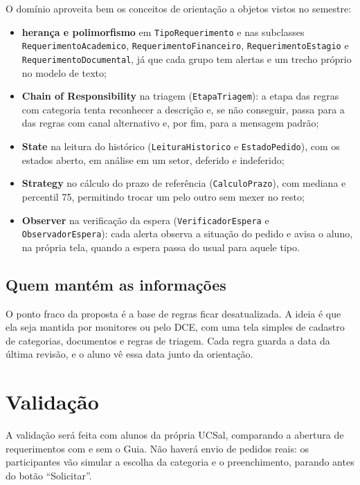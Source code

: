 \documentclass[12pt,a4paper]{article}
\begin{document}
O domínio aproveita bem os conceitos de orientação a objetos vistos no semestre:
\begin{itemize}
  \item \textbf{herança e polimorfismo} em \texttt{TipoRequerimento} e nas subclasses
        \texttt{RequerimentoAcademico}, \texttt{RequerimentoFinanceiro}, \texttt{RequerimentoEstagio} e
        \texttt{RequerimentoDocumental}, já que cada grupo tem alertas e um trecho próprio no modelo
        de texto;
  \item \textbf{Chain of Responsibility} na triagem (\texttt{EtapaTriagem}): a etapa das regras com
        categoria tenta reconhecer a descrição e, se não conseguir, passa para a das regras com canal
        alternativo e, por fim, para a mensagem padrão;
  \item \textbf{State} na leitura do histórico (\texttt{LeituraHistorico} e \texttt{EstadoPedido}),
        com os estados aberto, em análise em um setor, deferido e indeferido;
  \item \textbf{Strategy} no cálculo do prazo de referência (\texttt{CalculoPrazo}), com mediana e
        percentil 75, permitindo trocar um pelo outro sem mexer no resto;
  \item \textbf{Observer} na verificação da espera (\texttt{VerificadorEspera} e
        \texttt{ObservadorEspera}): cada alerta observa a situação do pedido e avisa o aluno, na
        própria tela, quando a espera passa do usual para aquele tipo.
\end{itemize}

\subsection{Quem mantém as informações}

O ponto fraco da proposta é a base de regras ficar desatualizada. A ideia é que ela seja mantida por
monitores ou pelo DCE, com uma tela simples de cadastro de categorias, documentos e regras de triagem.
Cada regra guarda a data da última revisão, e o aluno vê essa data junto da orientação.

\section{Validação}

A validação será feita com alunos da própria UCSal, comparando a abertura de requerimentos com e sem o
Guia. Não haverá envio de pedidos reais: os participantes vão simular a escolha da categoria e o
preenchimento, parando antes do botão ``Solicitar''.
\end{document}

